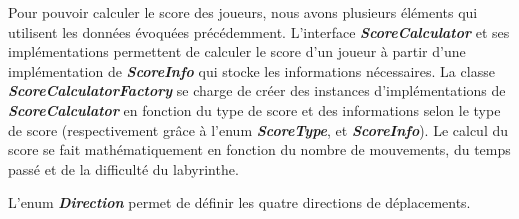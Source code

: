 Pour pouvoir calculer le score des joueurs, nous avons plusieurs éléments qui
utilisent les données évoquées précédemment. L'interface \textbf{\textit{ScoreCalculator}}
et ses implémentations permettent de calculer le score d'un joueur à partir
d'une implémentation de \textbf{\textit{ScoreInfo}} qui stocke les informations
nécessaires. La classe \textbf{\textit{ScoreCalculatorFactory}} se charge de créer des
instances d'implémentations de \textbf{\textit{ScoreCalculator}} en fonction du type de
score et des informations selon le type de score (respectivement grâce à l'enum
\textbf{\textit{ScoreType}}, et \textbf{\textit{ScoreInfo}}). Le calcul du score se fait
mathématiquement en fonction du nombre de mouvements, du temps passé et de la
difficulté du labyrinthe.

L'enum \textbf{\textit{Direction}} permet de définir les quatre directions de déplacements.
